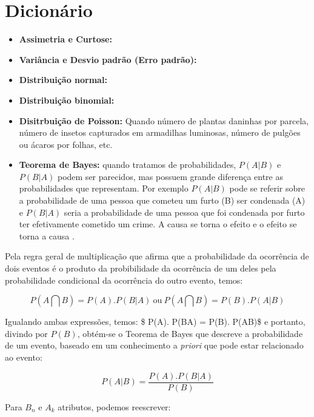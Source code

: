 \documentclass[
]{book}
\begin{document}
\hypertarget{dicio}{%
\section{Dicionário}\label{dicio}}

\begin{itemize}
\item
  \textbf{Assimetria e Curtose:}
\item
  \textbf{Variância e Desvio padrão (Erro padrão):}
\item
  \textbf{Distribuição normal:}
\item
  \textbf{Distribuição binomial:}
\item
  \textbf{Disitrbuição de Poisson:} \citep{banzatto1992experimentaccao} Quando número de plantas daninhas por parcela, número de insetos capturados em armadilhas luminosas, número de pulgões ou ácaros por folhas, etc.
\item
  \textbf{Teorema de Bayes:} quando tratamos de probabilidades, \(P(A|B)\) e \(P(B|A)\) podem ser parecidos, mas possuem grande diferença entre as probabilidades que representam. Por exemplo \(P(A|B)\) pode se referir sobre a probabilidade de uma pessoa que cometeu um furto (B) ser condenada (A) e \(P(B|A)\) seria a probabilidade de uma pessoa que foi condenada por furto ter efetivamente cometido um crime. A causa se torna o efeito e o efeito se torna a causa \citep{freund2009estatistica}.
\end{itemize}

Pela regra geral de multiplicação que afirma que a probabilidade da ocorrência de dois eventos é o produto da probibilidade da ocorrência de um deles pela probabilidade condicional da ocorrência do outro evento, temos:

\begin{equation} 
 P(A \bigcap B)= P(A). P(B|A) \  \mbox{ou} \ P(A \bigcap B)= P(B). P(A|B)
  \label{eq:multprob}
\end{equation}

Igualando ambas expressões, temos: \$ P(A). P(B\textbar{}A) = P(B). P(A\textbar{}B)\$ e portanto, divindo por \(P(B)\), obtém-se o Teorema de Bayes que descreve a probabilidade de um evento, baseado em um conhecimento a \emph{priori} que pode estar relacionado ao evento:

\begin{equation} 
 P(A|B) = \frac{P(A).P(B|A)}{P(B)}
  \label{eq:bayes}
\end{equation}

Para \(B_n\) e \(A_k\) atributos, podemos reescrever:
\end{document}
